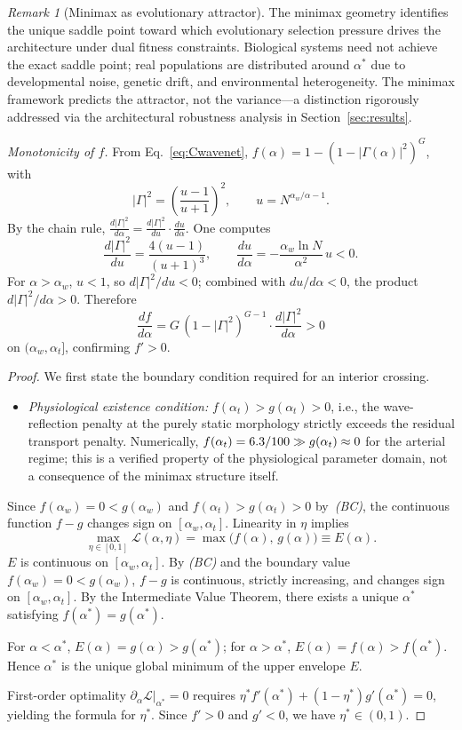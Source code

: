 \documentclass[11pt,a4paper]{article}
\theoremstyle{remark}
\newtheorem{remark}{Remark}
\begin{document}
\begin{remark}[Minimax as evolutionary attractor]
The minimax geometry identifies the unique saddle point toward which
evolutionary selection pressure drives the architecture under dual fitness
constraints. Biological systems need not achieve the exact saddle point; real
populations are distributed around $\alpha^*$ due to developmental noise,
genetic drift, and environmental heterogeneity. The minimax framework predicts
the attractor, not the variance---a distinction rigorously addressed via the
architectural robustness analysis in Section~\ref{sec:results}.
\end{remark}

\textit{Monotonicity of $f$.}
From Eq.~\eqref{eq:Cwavenet}, $f(\alpha) = 1-(1-|\Gamma(\alpha)|^2)^G$, with
\[
  |\Gamma|^2 = \left(\frac{u-1}{u+1}\right)^{\!2}, \qquad u = N^{\alpha_w/\alpha - 1}.
\]
By the chain rule, $\tfrac{d|\Gamma|^2}{d\alpha} =
\tfrac{d|\Gamma|^2}{du}\cdot\tfrac{du}{d\alpha}$.
One computes
\[
  \frac{d|\Gamma|^2}{du} = \frac{4(u-1)}{(u+1)^3}, \qquad
  \frac{du}{d\alpha} = -\frac{\alpha_w \ln N}{\alpha^2}\,u < 0.
\]
For $\alpha > \alpha_w$, $u < 1$, so $d|\Gamma|^2/du < 0$; combined with
$du/d\alpha < 0$,
the product $d|\Gamma|^2/d\alpha > 0$.
Therefore
\[
  \frac{df}{d\alpha} = G\,(1-|\Gamma|^2)^{G-1}\cdot\frac{d|\Gamma|^2}{d\alpha} > 0
\]
on $(\alpha_w,\alpha_t]$, confirming $f' > 0$.

\begin{proof}
We first state the boundary condition required for an interior crossing.
\begin{itemize}
  \item[\emph{(BC)}] \emph{Physiological existence condition:} $f(\alpha_t) > g(\alpha_t) > 0$, i.e., the wave-reflection penalty at the purely static morphology strictly exceeds the residual transport penalty. Numerically, $f(\alpha_t) = 6.3/100 \gg g(\alpha_t) \approx 0$ for the arterial regime; this is a verified property of the physiological parameter domain, not a consequence of the minimax structure itself.
\end{itemize}
Since $f(\alpha_w) = 0 < g(\alpha_w)$ and $f(\alpha_t) > g(\alpha_t) > 0$
by~\emph{(BC)}, the continuous function $f - g$ changes sign on $[\alpha_w,
\alpha_t]$.
Linearity in $\eta$ implies
\[
  \max_{\eta \in [0,1]} \mathcal{L}(\alpha, \eta) = \max\bigl(f(\alpha),\, g(\alpha)\bigr) \equiv E(\alpha).
\]
$E$ is continuous on $[\alpha_w, \alpha_t]$. By \emph{(BC)} and the
boundary value $f(\alpha_w) = 0 < g(\alpha_w)$, $f - g$ is continuous,
strictly increasing, and changes sign on $[\alpha_w,\alpha_t]$.
By the Intermediate Value Theorem, there exists a unique $\alpha^*$ satisfying
$f(\alpha^*) = g(\alpha^*)$.

For $\alpha < \alpha^*$, $E(\alpha) = g(\alpha) > g(\alpha^*)$; for $\alpha >
\alpha^*$, $E(\alpha) = f(\alpha) > f(\alpha^*)$. Hence $\alpha^*$ is the unique
global minimum of the upper envelope $E$.

First-order optimality $\partial_\alpha \mathcal{L}|_{\alpha^*} = 0$ requires
$\eta^* f'(\alpha^*) + (1-\eta^*)g'(\alpha^*) = 0$, yielding the formula for
$\eta^*$. Since $f' > 0$ and $g' < 0$, we have $\eta^* \in (0,1)$.
\end{proof}
\end{document}
